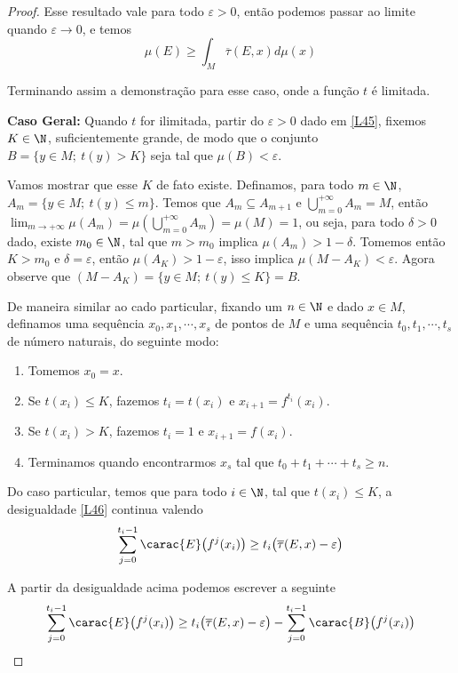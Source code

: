 \begin{proof}
Esse resultado vale para todo $\varepsilon>0$, então podemos passar ao limite quando $\varepsilon\to0$, e temos
\begin{equation*}
\mu(E)\geq\int_{M}\overline{\tau}(E,x)d\mu(x)
\end{equation*}

Terminando assim a demonstração para esse caso, onde a função $t$ é limitada.

\textbf{Caso Geral:} Quando $t$ for ilimitada, partir do $\varepsilon>0$ dado em \eqref{L45}, fixemos $K\in\N$, suficientemente grande, de modo que o conjunto $B=\big\{y\in M;\ t(y)>K\big\}$ seja tal que $\mu(B)<\varepsilon$. 

Vamos mostrar que esse $K$ de fato existe. Definamos, para todo $m\in \N$, $A_m=\big\{y\in M;\ t(y)\leq m\big\}$. Temos que $A_m\subseteq A_{m+1}$ e $\bigcup_{m=0}^{+\infty}A_m=M$, então $\lim_{m\to+\infty}\mu(A_m)=\mu\left(\bigcup_{m=0}^{+\infty}A_m\right)=\mu(M)=1$, ou seja, para todo $\delta>0$ dado, existe $m_0\in\N$, tal que $m>m_0$ implica $\mu(A_m)>1-\delta$. Tomemos então $K>m_0$ e $\delta=\varepsilon$, então $\mu(A_K)>1-\varepsilon$, isso implica $\mu(M-A_K)<\varepsilon$. Agora observe que $(M-A_K)=\big\{y\in M;\ t(y)\leq K\big\}=B$. 

De maneira similar ao cado particular, fixando um $n\in\N$ e dado $x \in M$, definamos uma sequência $x_0,x_1,\cdots,x_s$ de pontos de $M$ e uma sequência $t_0,t_1,\cdots,t_s$ de número naturais, do seguinte modo:

\begin{enumerate}
\item Tomemos $x_0=x$.
\item Se $t(x_i)\leq K$, fazemos $t_i=t(x_i)$ e $x_{i+1}=f^{t_i}(x_i)$.
\item Se $t(x_i)> K$, fazemos $t_i=1$ e $x_{i+1}=f(x_i)$.
\item Terminamos quando encontrarmos $x_s$ tal que $t_0+t_1+\cdots+t_s\geq n$.
\end{enumerate}

Do caso particular, temos que para todo $i\in\N$, tal que $t(x_i)\leq K$, a desigualdade \eqref{L46} continua valendo
\begin{equation}\label{L47}
\sum_{j=0}^{t_i-1}\carac{E}\big(f^j(x_i)\big)\geq t_i\big(\overline{\tau}(E,x)-\varepsilon\big)
\end{equation}

A partir da desigualdade acima podemos escrever a seguinte
\begin{equation}\label{L48}
\sum_{j=0}^{t_i-1}\carac{E}\big(f^j(x_i)\big)\geq t_i\big(\overline{\tau}(E,x)-\varepsilon\big)-\sum_{j=0}^{t_i-1}\carac{B}\big(f^j(x_i)\big)
\end{equation}


\end{proof}
